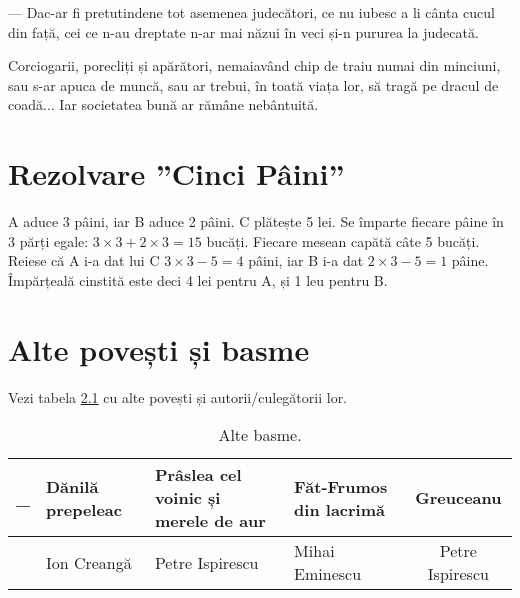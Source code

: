\documentclass[12pt, a4paper, oneside, romanian]{teza-upb}
\begin{document}
— Dac-ar fi pretutindene tot asemenea judecători, ce nu iubesc a li cânta cucul din față, cei ce n-au dreptate n-ar mai năzui în veci și-n pururea la judecată.

Corciogarii, porecliți și apărători, nemaiavând chip de traiu numai din minciuni, sau s-ar apuca de muncă, sau ar trebui, în toată viața lor, să tragă pe dracul de coadă... Iar societatea bună ar rămâne nebântuită.







\appendix
\chapter {Rezolvare ''Cinci Pâini''}
A aduce 3 pâini, iar B aduce 2 pâini. C plătește 5 lei.  Se împarte
fiecare pâine în 3 părți egale: $3 \times 3 + 2 \times 3 = 15$
bucăți. Fiecare mesean capătă câte 5 bucăți. Reiese că A i-a dat lui C
$3 \times 3 - 5 = 4$ pâini, iar B i-a dat $2 \times 3 - 5 = 1$
pâine. Împărțeală cinstită este deci 4 lei pentru A, și 1 leu pentru B.

\chapter{Alte povești și basme}

 Vezi tabela \ref{altebasme} cu alte povești și autorii/culegătorii lor.


\begin{table}
\begin{tabular}[t]{c|p{3cm}|p{3cm}|p{3cm}|c}
\_ & Dănilă prepeleac & Prâslea cel voinic și merele de aur & Făt-Frumos din lacrimă & Greuceanu \\
\hline
 & Ion Creangă & Petre Ispirescu & Mihai Eminescu & Petre Ispirescu \\
\end{tabular}
\label{altebasme}
\caption{Alte basme.}
\end{table}
\end{document}
